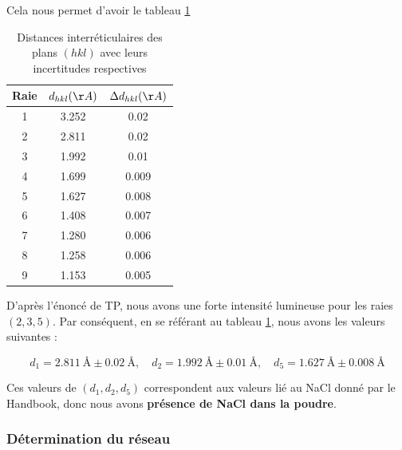 \newpage
Cela nous permet d'avoir le tableau \ref{tab:Tableau des dhkl correspondant aux différentes raies}
\begin{table}[h!]
	\centering
	\begin{tabular}{|c|c|c|}
		
		\hline
	Raie &	$ d_{hkl} (\AA) $& $\Delta d_{hkl} (\AA)$  \\ \hline
	 1& 3.252	&         0.02                     \\ \hline
	2& 2.811	&      0.02                         \\ \hline
	3& 1.992	&       0.01                       \\ \hline
	4& 1.699	&         0.009                     \\ \hline
	5& 1.627	&        0.008                       \\ \hline
	6&1.408	&          0.007                     \\ \hline
	7& 1.280	&       0.006                        \\ \hline
	8& 1.258	&       0.006                        \\ \hline
	9& 1.153	&        0.005                       \\ \hline
	\end{tabular}
	\caption{Distances interréticulaires des plans $(h k l)$ avec leurs incertitudes respectives}
	\label{tab:Tableau des dhkl correspondant aux différentes raies}
\end{table}

D'après l'énoncé de TP, nous avons une forte intensité lumineuse pour les raies $(2, 3, 5)$. Par conséquent, en se référant au tableau \ref{tab:Tableau des dhkl correspondant aux différentes raies}, nous avons les valeurs suivantes :

\begin{equation}
	d_1 = 2.811 \ \text{Å} \pm 0.02 \ \text{Å}, \quad d_2 = 1.992 \ \text{Å} \pm 0.01 \ \text{Å}, \quad d_5 = 1.627 \ \text{Å} \pm 0.008 \ \text{Å}
\end{equation}

Ces valeurs de $(d_1, d_2, d_5)$ correspondent aux valeurs lié au NaCl donné par le Handbook, donc nous avons\textbf{ présence de NaCl dans la poudre}.

\subsubsection{Détermination du réseau}


